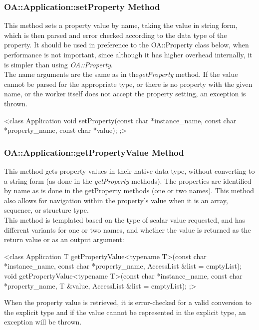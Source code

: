 \documentclass[10pt, a4paper, oneside]{article}
\renewcommand\_{\textunderscore\allowbreak} %
\begin{document}
\subsubsection{OA::Application::setProperty Method}This method sets a property value by name, taking the value in string form, which is then parsed and error checked according to the data type of the property.  It should be used in preference to the OA::Property class below, when performance is not important, since although it has higher overhead internally, it is simpler than using \emph{OA::Property}.\\

The name arguments are the same as in the\emph{getProperty} method. If the value cannot be parsed for the appropriate type, or there is no property with the given name, or the worker itself does not accept the property setting, an exception is thrown.
\begin{ocpixml}
<class Application {
	void setProperty(const char *instance_name,
	const char *property_name,
	const char *value);
};>\end{ocpixml}
\subsubsection{OA::Application::getPropertyValue Method}This method gets property values in their native data type, without converting to a string form (as done in the \emph{getProperty} methods). The properties are identified by name as is done in the getProperty methods (one or two names).  This method also allows for navigation within the property's value when it is an array, sequence, or structure type. \\

This method is templated based on the type of scalar value requested, and has different variants for one or two names, and whether the value is returned as the return value or as an output argument:
\begin{ocpixml}
<class Application {
	T getPropertyValue<typename T>(const char *instance_name,
	const char *property_name,
	AccessList &list = emptyList);
	void getPropertyValue<typename T>(const char *instance_name,
	const char *property_name,
	T &value,
	AccessList &list = emptyList);
};>\end{ocpixml}When the property value is retrieved, it is error-checked for a valid conversion to the explicit type and if the value cannot be represented in the explicit type, an exception will be thrown.\\
\end{document}
